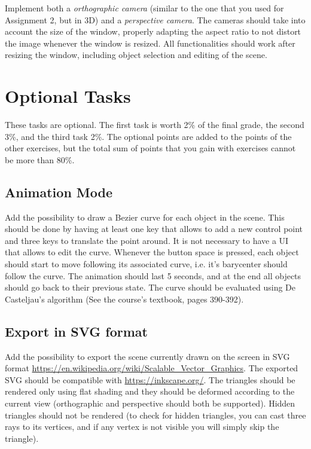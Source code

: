 \documentclass[11pt]{article}
\begin{document}
Implement both a \emph{orthographic camera} (similar to the one that you used for Assignment 2, but in 3D) and a \emph{perspective camera}. The cameras should take into account the size of the window, properly adapting the aspect ratio to not distort the image whenever the window is resized. All functionalities should work after resizing the window, including object selection and editing of the scene.

\section*{Optional Tasks}

These tasks are optional. The first task is worth 2\% of the final grade, the second 3\%, and the third task 2\%. The optional points are added to the points of the other exercises, but the total sum of points that you gain with exercises cannot be more than 80\%.

\subsection{Animation Mode}

Add the possibility to draw a Bezier curve for each object in the scene. This should be done by having at least one key that allows to add a new control point and three keys to translate the point around. It is not necessary to have a UI that allows to edit the curve. Whenever the button space is pressed, each object should start to move following its associated curve, i.e. it's barycenter should follow the curve. The animation should last 5 seconds, and at the end all objects should go back to their previous state. The curve should be evaluated using De Casteljau's algorithm (See the course's textbook, pages 390-392).

\subsection{Export in SVG format}

Add the possibility to export the scene currently drawn on the screen in SVG format \url{https://en.wikipedia.org/wiki/Scalable_Vector_Graphics}. The exported SVG should be compatible with \url{https://inkscape.org/}. The triangles should be rendered only using flat shading and they should be deformed according to the current view (orthographic and perspective should both be supported). Hidden triangles should not be rendered (to check for hidden triangles, you can cast three rays to its vertices, and if any vertex is not visible you will simply skip the triangle).
\end{document}
